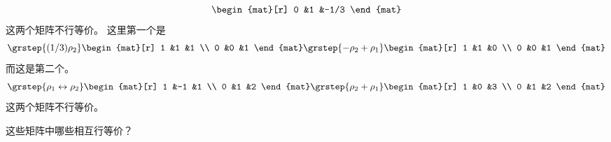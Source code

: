\begin{exercises}
\begin{answer}
\begin{exparts}
\begin{equation*}
\begin{mat}[r]
              0  &1  &-1/3
            \end{mat}
          \end{equation*}
          这两个矩阵不行等价。
        \partsitem 这里第一个是
          \begin{equation*}
            \grstep{(1/3)\rho_2}
            \begin{mat}[r]
              1  &1  &1  \\
              0  &0  &1
            \end{mat}
            \grstep{-\rho_2+\rho_1}
            \begin{mat}[r]
              1  &1  &0  \\
              0  &0  &1
            \end{mat}
          \end{equation*}
          而这是第二个。
          \begin{equation*}
            \grstep{\rho_1\leftrightarrow\rho_2}
            \begin{mat}[r]
              1  &-1 &1  \\
              0  &1  &2
            \end{mat}
            \grstep{\rho_2+\rho_1}
            \begin{mat}[r]
              1  &0  &3  \\
              0  &1  &2
            \end{mat}
          \end{equation*}
          这两个矩阵不行等价。
       \end{exparts}  
     \end{answer}
  \item 
    这些矩阵中哪些相互行等价？
\end{exercises}
